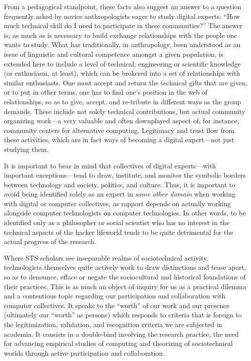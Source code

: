 \documentclass[10pt,letter,oneside]{scrartcl}
\begin{document}
From a pedagogical standpoint, these facts also suggest an answer to a
question frequently asked by novice anthropologists eager to study
digital experts: ``How much technical skill do I need to participate
in these communities?''  The answer is, as much as is necessary to
build exchange relationships with the people one wants to study.  What
has traditionally, in anthropology, been understood as an issue of
linguistic and cultural competence amongst a given population, is
extended here to include a level of technical, engineering or
scientific knowledge (or enthusiasm, at least), which can be brokered
into a set of relationships with similar enthusiasts. One must accept
and return the technical gifts that are given, or to put in other
terms, one has to find one's position in the web of relationships, so
as to give, accept, and re-tribute in different ways as the group
demands. These include not solely technical contributions, but actual
community organizing work---a very valuable and often downplayed
aspect of, for instance, community centers for alternative computing.
Legitimacy and trust flow from these activities, which are in fact
ways of becoming a digital expert---not just studying them.

It is important to bear in mind that collectives of digital
experts---with important exceptions---tend to draw, institute, and
monitor the symbolic borders between technology and society, politics,
and culture. Thus, it is important to avoid being identified solely as
an expert in \emph{some other domain} when working with digital or
computer collectives, as rapport depends on actually working alongside
computer technologists on computer technologies.  In other words, to
be identified only as a philosopher or social scientist who has no interest
in the technical aspects of the hacker lifeworld tends to be quite
detrimental for the actual progress of the research.

Where STS scholars see inseparable realms of sociotechnical activity,
technologists themselves quite actively work to draw distinctions and
tease apart, so as to denounce, efface or negate the sociocultural and
historical foundations of their practices.  This is as much an object
of inquiry for us as a practical dilemma and a contentious topic
regarding our participation and collaboration with computer
collectives. It speaks to the ``worth'' of our work \cite{Stark2009} and
our presence (ultimately our ``worth'' as persons) which responds to
criteria that is foreign to the legitimization, validation, and
recognition criteria we are subjected in academia.  It consists in a
double-bind involving the research practice, the need for advancing
empirical studies of computing and theorizing of sociotechnical worlds
through active participation and collaboration.
\end{document}
